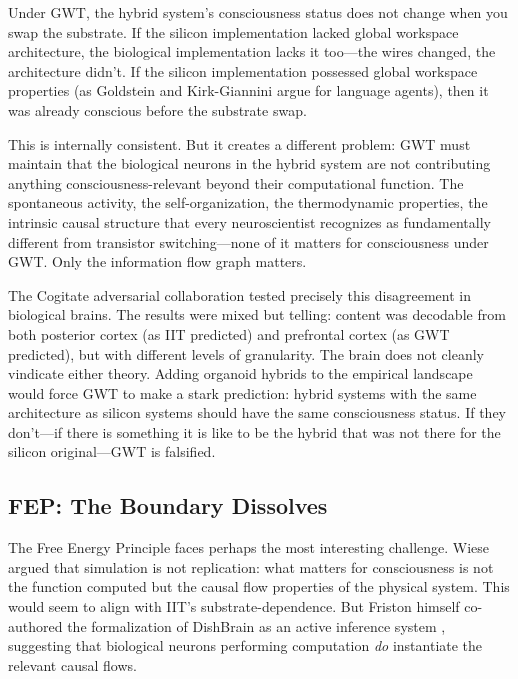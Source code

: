 Under GWT, the hybrid system's consciousness status does not change when you swap
the substrate. If the silicon implementation lacked global workspace architecture,
the biological implementation lacks it too---the wires changed, the architecture
didn't. If the silicon implementation possessed global workspace properties (as
Goldstein and Kirk-Giannini \cite{goldstein2024case} argue for language agents), then
it was already conscious before the substrate swap.

This is internally consistent. But it creates a different problem: GWT must maintain
that the biological neurons in the hybrid system are not contributing anything
consciousness-relevant beyond their computational function. The spontaneous activity,
the self-organization, the thermodynamic properties, the intrinsic causal structure
that every neuroscientist recognizes as fundamentally different from transistor
switching---none of it matters for consciousness under GWT. Only the information flow
graph matters.

The Cogitate adversarial collaboration \cite{ferrante2025adversarial} tested precisely
this disagreement in biological brains. The results were mixed but telling: content
was decodable from both posterior cortex (as IIT predicted) and prefrontal cortex
(as GWT predicted), but with different levels of granularity. The brain does not
cleanly vindicate either theory. Adding organoid hybrids to the empirical landscape
would force GWT to make a stark prediction: hybrid systems with the same architecture
as silicon systems should have the same consciousness status. If they don't---if
there is something it is like to be the hybrid that was not there for the silicon
original---GWT is falsified.

\subsection{FEP: The Boundary Dissolves}

The Free Energy Principle faces perhaps the most interesting challenge. Wiese
\cite{wiese2024fep} argued that simulation is not replication: what matters for
consciousness is not the function computed but the causal flow properties of the
physical system. This would seem to align with IIT's substrate-dependence. But
Friston himself co-authored the formalization of DishBrain as an active inference
system \cite{friston2025active}, suggesting that biological neurons performing
computation \emph{do} instantiate the relevant causal flows.

